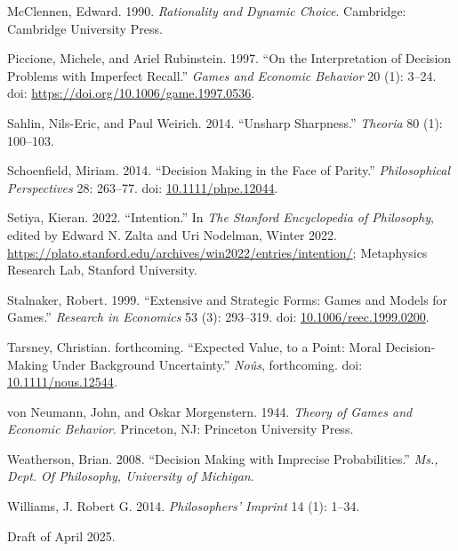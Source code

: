 \documentclass[
  11pt,
  letterpaper,
  DIV=11,
  numbers=noendperiod,
  twoside]{scrartcl}
\newlength{\cslhangindent}
\newenvironment{CSLReferences}[2] %
 {\begin{list}{}{%
  \setlength{\itemindent}{0pt}
  \setlength{\leftmargin}{0pt}
  \setlength{\parsep}{0pt}
  \ifodd #1
   \setlength{\leftmargin}{\cslhangindent}
   \setlength{\itemindent}{-1\cslhangindent}
  \fi
  \setlength{\itemsep}{#2\baselineskip}}}
 {\end{list}}
\begin{document}
\begin{CSLReferences}{1}{0}
McClennen, Edward. 1990. \emph{Rationality and Dynamic Choice}.
Cambridge: {C}ambridge {U}niversity {P}ress.

Piccione, Michele, and Ariel Rubinstein. 1997. {``On the Interpretation
of Decision Problems with Imperfect Recall.''} \emph{Games and Economic
Behavior} 20 (1): 3--24. doi:
\url{https://doi.org/10.1006/game.1997.0536}.

Sahlin, Nils-Eric, and Paul Weirich. 2014. {``Unsharp Sharpness.''}
\emph{Theoria} 80 (1): 100--103.

Schoenfield, Miriam. 2014. {``Decision Making in the Face of Parity.''}
\emph{Philosophical Perspectives} 28: 263--77. doi:
\href{https://doi.org/10.1111/phpe.12044}{10.1111/phpe.12044}.

Setiya, Kieran. 2022. {``{Intention}.''} In \emph{The {Stanford}
Encyclopedia of Philosophy}, edited by Edward N. Zalta and Uri Nodelman,
{W}inter 2022.
\url{https://plato.stanford.edu/archives/win2022/entries/intention/};
Metaphysics Research Lab, Stanford University.

Stalnaker, Robert. 1999. {``Extensive and Strategic Forms: Games and
Models for Games.''} \emph{Research in Economics} 53 (3): 293--319. doi:
\href{https://doi.org/10.1006/reec.1999.0200}{10.1006/reec.1999.0200}.

Tarsney, Christian. forthcoming. {``Expected Value, to a Point: Moral
Decision-Making Under Background Uncertainty.''} \emph{Noûs},
forthcoming. doi:
\href{https://doi.org/10.1111/nous.12544}{10.1111/nous.12544}.

von Neumann, John, and Oskar Morgenstern. 1944. \emph{Theory of Games
and Economic Behavior}. Princeton, NJ: Princeton University Press.

Weatherson, Brian. 2008. {``Decision Making with Imprecise
Probabilities.''} \emph{Ms., Dept. Of Philosophy, University of
Michigan}.

Williams, J. Robert G. 2014. \emph{Philosophers' Imprint} 14 (1): 1--34.

\end{CSLReferences}



\noindent Draft of April 2025.
\end{document}
